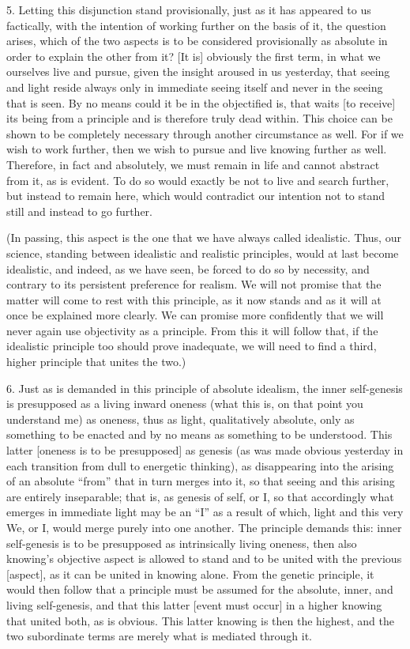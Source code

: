 5. Letting this disjunction stand provisionally,
just as it has appeared to us factically,
with the intention of working further
on the basis of it, the question arises,
which of the two aspects is to be
considered provisionally as absolute
in order to explain the other from it?
[It is] obviously the first term,
in what we ourselves live and pursue,
given the insight aroused in us yesterday,
that seeing and light reside always
only in immediate seeing itself and
never in the seeing that is seen.
By no means could it be in the objectified is,
that waits [to receive] its being from a principle
and is therefore truly dead within.
This choice can be shown to be completely necessary
through another circumstance as well.
For if we wish to work further,
then we wish to pursue and live knowing further as well.
Therefore, in fact and absolutely, we must remain in life
and cannot abstract from it, as is evident.
To do so would exactly be not to live and search further,
but instead to remain here,
which would contradict our intention
not to stand still and instead to go further.

(In passing, this aspect is the one
that we have always called idealistic.
Thus, our science, standing between
idealistic and realistic principles,
would at last become idealistic,
and indeed, as we have seen,
be forced to do so by necessity,
and contrary to its persistent
preference for realism.
We will not promise that the matter
will come to rest with this principle,
as it now stands and as it will
at once be explained more clearly.
We can promise more confidently that
we will never again use objectivity as a principle.
From this it will follow that,
if the idealistic principle too
should prove inadequate,
we will need to find a third, higher principle
that unites the two.)

6. Just as is demanded in this principle of absolute idealism,
the inner self-genesis is presupposed
as a living inward oneness
(what this is, on that point you understand me)
as oneness, thus as light, qualitatively absolute,
only as something to be enacted
and by no means as something to be understood.
This latter [oneness is to be presupposed] as genesis
(as was made obvious yesterday in each transition
from dull to energetic thinking),
as disappearing into the arising
of an absolute “from”
that in turn merges into it,
so that seeing and this arising are entirely inseparable;
that is, as genesis of self, or I,
so that accordingly what emerges in immediate light
may be an “I” as a result of which,
light and this very We, or I,
would merge purely into one another.
The principle demands this:
inner self-genesis is to be presupposed
as intrinsically living oneness,
then also knowing's objective aspect is
allowed to stand and to be united
with the previous [aspect],
as it can be united in knowing alone.
From the genetic principle,
it would then follow that a principle must be assumed for
the absolute, inner, and living self-genesis,
and that this latter [event must occur]
in a higher knowing that united both, as is obvious.
This latter knowing is then the highest,
and the two subordinate terms are
merely what is mediated through it.

